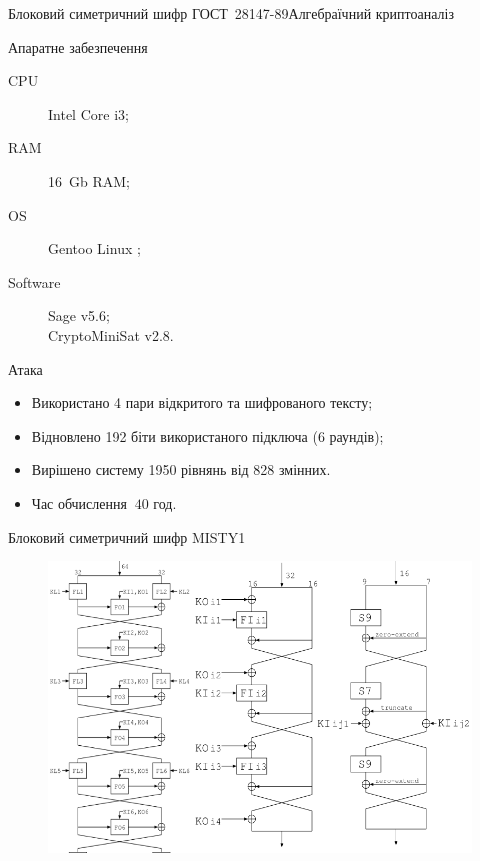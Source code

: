 \documentclass[10pt, ucs]{beamer}
\newenvironment{changemargin}[2]{%
\begin{list}{}{%
\setlength{\topsep}{0pt}%
\setlength{\leftmargin}{#1}%
\setlength{\rightmargin}{#2}%
\setlength{\listparindent}{\parindent}%
\setlength{\itemindent}{\parindent}%
\setlength{\parsep}{\parskip}%
}%
\item[]}{\end{list}}
\begin{document}
\begin{frame}[shrink]{Блоковий симетричний шифр ГОСТ~28147-89}{Алгебраїчний криптоаналіз}
    \begin{block}{Апаратне забезпечення}
        \begin{description}
            \item[CPU] Intel Core i3;
            \item[RAM] 16~Gb RAM;
            \item[OS] Gentoo Linux ;
            \item[Software] Sage v5.6;\\
                CryptoMiniSat v2.8.
        \end{description}
    \end{block}
    \begin{block}{Атака}
        \begin{itemize}
            \item Використано 4 пари відкритого та шифрованого тексту;
            \item Відновлено 192 біти використаного підключа (6 раундів);
            \item Вирішено систему 1950 рівнянь від 828 змінних.
            \item Час обчислення $~40$ год.
        \end{itemize}
    \end{block}
\end{frame}

\begin{frame}{Блоковий симетричний шифр MISTY1}
    \begin{changemargin}{-2cm}{-2cm}
        \begin{figure}[htbp]
            \centering
            \includegraphics[scale=0.4]{misty}
        \end{figure}
    \end{changemargin}
\end{frame}
\end{document}

